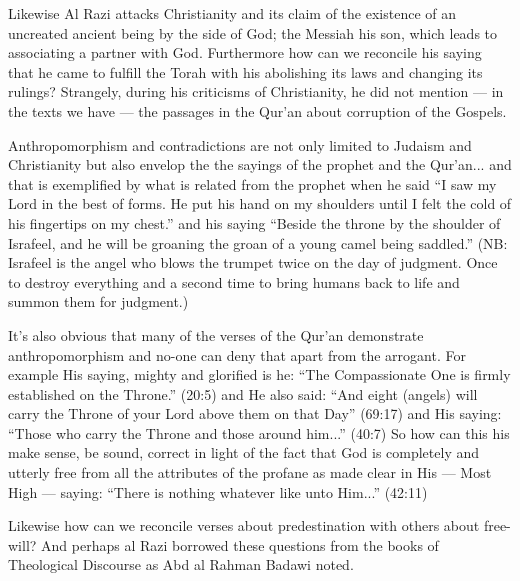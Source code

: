 \documentclass[12pt]{book}
\begin{document}
Likewise Al Razi attacks Christianity and its claim of the existence of
an uncreated ancient being by the side of God;
the Messiah his son, which leads to associating a partner with God.
Furthermore how can we reconcile his saying that he came to fulfill the Torah
with his abolishing its laws and changing its rulings?
Strangely, during his criticisms of Christianity,
he did not mention — in the texts we have —
the passages in the Qur’an about corruption of the Gospels.\footnotemark


Anthropomorphism and contradictions are not only limited to Judaism and
Christianity but also envelop the the sayings of the prophet and the Qur’an...
and that is exemplified by what is related from the prophet when he said
“I saw my Lord in the best of forms.
He put his hand on my shoulders until I felt
the cold of his fingertips on my chest.”\footnotemark
{}
and his saying “Beside the throne by the shoulder of Israfeel,
and he will be groaning the groan of a young camel being saddled.”\footnotemark
(NB: Israfeel is the angel who blows the trumpet twice on the day of judgment.
Once to destroy everything and a second time to bring humans back to life and
summon them for judgment.)


It’s also obvious that many of the verses of the Qur’an demonstrate
anthropomorphism and no-one can deny that apart from the arrogant.
For example His saying, mighty and glorified is he:
“The Compassionate One is firmly established on the Throne.” (20:5)
and He also said: “And eight (angels) will carry the Throne of your Lord
above them on that Day” (69:17) and His saying:
“Those who carry the Throne and those around him...” (40:7)
So how can this his make sense, be sound, correct in light of the fact that
God is completely and utterly free from all the attributes of the profane as
made clear in His — Most High — saying:
“There is nothing whatever like unto Him...” (42:11)

Likewise how can we reconcile verses about predestination
with others about free-will?
And perhaps al Razi borrowed these questions from the books of
Theological Discourse as Abd al Rahman Badawi noted.\footnotemark

\end{document}
